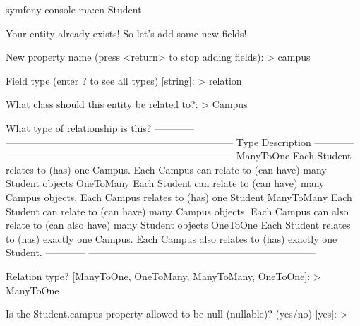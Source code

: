 \documentclass[a4paperpaper,openright]{book}
\newenvironment{Shaded}{}{}
\newcommand{\ExtensionTok}[1]{#1}
\newcommand{\NormalTok}[1]{#1}
\newcommand{\StringTok}[1]{\textcolor[rgb]{0.25,0.44,0.63}{#1}}
\begin{document}
\begin{Shaded}
\begin{Highlighting}[]
 \ExtensionTok{symfony}\NormalTok{ console ma:en Student}

 \ExtensionTok{Your}\NormalTok{ entity already exists! So let}\StringTok{'s add some new fields!}

\StringTok{ New property name (press <return> to stop adding fields):}
\StringTok{ > campus}

\StringTok{ Field type (enter ? to see all types) [string]:}
\StringTok{ > relation}

\StringTok{ What class should this entity be related to?:}
\StringTok{ > Campus}

\StringTok{What type of relationship is this?}
\StringTok{ ------------ --------------------------------------------------------------------- }
\StringTok{  Type         Description                                                          }
\StringTok{ ------------ --------------------------------------------------------------------- }
\StringTok{  ManyToOne    Each Student relates to (has) one Campus.                            }
\StringTok{               Each Campus can relate to (can have) many Student objects            }
\StringTok{                                                                                    }
\StringTok{  OneToMany    Each Student can relate to (can have) many Campus objects.           }
\StringTok{               Each Campus relates to (has) one Student                             }
\StringTok{                                                                                    }
\StringTok{  ManyToMany   Each Student can relate to (can have) many Campus objects.           }
\StringTok{               Each Campus can also relate to (can also have) many Student objects  }
\StringTok{                                                                                    }
\StringTok{  OneToOne     Each Student relates to (has) exactly one Campus.                    }
\StringTok{               Each Campus also relates to (has) exactly one Student.               }
\StringTok{ ------------ --------------------------------------------------------------------- }

\StringTok{ Relation type? [ManyToOne, OneToMany, ManyToMany, OneToOne]:}
\StringTok{ > ManyToOne}

\StringTok{ Is the Student.campus property allowed to be null (nullable)? (yes/no) [yes]:}
\StringTok{ > }
\end{Highlighting}
\end{Shaded}
\end{document}

